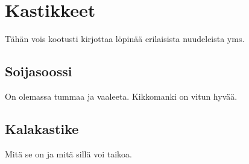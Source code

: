 \documentclass[../keittiokirja.tex]{subfiles}
\begin{document}
\section{Kastikkeet}
\label{sec:kastikkeet}

Tähän vois kootusti kirjottaa löpinää erilaisista nuudeleista yms.

\subsection{Soijasoossi}

On olemassa tummaa ja vaaleeta. Kikkomanki on vitun hyvää.

\subsection{Kalakastike}

Mitä se on ja mitä sillä voi taikoa.
\end{document}

